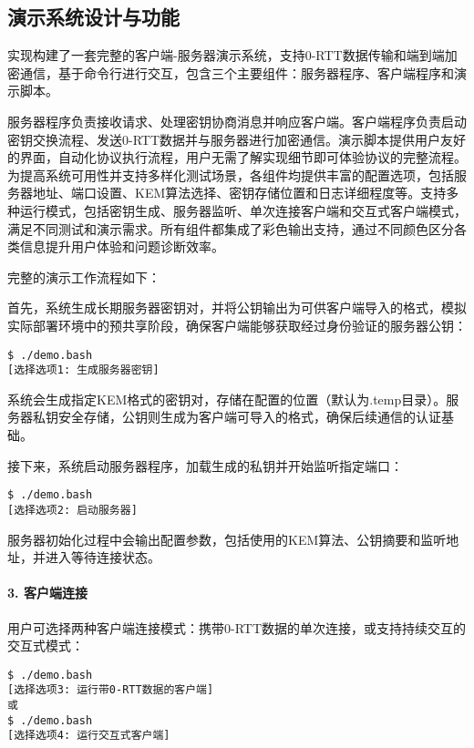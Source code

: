 \subsection{演示系统设计与功能}

实现构建了一套完整的客户端-服务器演示系统，支持0-RTT数据传输和端到端加密通信，基于命令行进行交互，包含三个主要组件：服务器程序、客户端程序和演示脚本。

服务器程序负责接收请求、处理密钥协商消息并响应客户端。客户端程序负责启动密钥交换流程、发送0-RTT数据并与服务器进行加密通信。演示脚本提供用户友好的界面，自动化协议执行流程，用户无需了解实现细节即可体验协议的完整流程。为提高系统可用性并支持多样化测试场景，各组件均提供丰富的配置选项，包括服务器地址、端口设置、KEM算法选择、密钥存储位置和日志详细程度等。支持多种运行模式，包括密钥生成、服务器监听、单次连接客户端和交互式客户端模式，满足不同测试和演示需求。所有组件都集成了彩色输出支持，通过不同颜色区分各类信息提升用户体验和问题诊断效率。

完整的演示工作流程如下：

首先，系统生成长期服务器密钥对，并将公钥输出为可供客户端导入的格式，模拟实际部署环境中的预共享阶段，确保客户端能够获取经过身份验证的服务器公钥：

\begin{verbatim}
$ ./demo.bash
[选择选项1: 生成服务器密钥]
\end{verbatim}

系统会生成指定KEM格式的密钥对，存储在配置的位置（默认为.temp目录）。服务器私钥安全存储，公钥则生成为客户端可导入的格式，确保后续通信的认证基础。

接下来，系统启动服务器程序，加载生成的私钥并开始监听指定端口：

\begin{verbatim}
$ ./demo.bash
[选择选项2: 启动服务器]
\end{verbatim}

服务器初始化过程中会输出配置参数，包括使用的KEM算法、公钥摘要和监听地址，并进入等待连接状态。

\paragraph{3. 客户端连接} 
用户可选择两种客户端连接模式：携带0-RTT数据的单次连接，或支持持续交互的交互式模式：

\begin{verbatim}
$ ./demo.bash
[选择选项3: 运行带0-RTT数据的客户端]
或
$ ./demo.bash
[选择选项4: 运行交互式客户端]
\end{verbatim}


